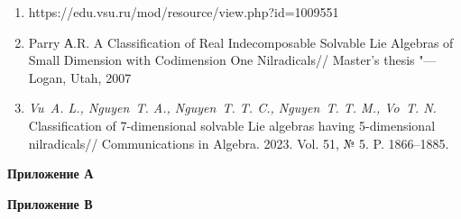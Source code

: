 \href{\href{}{}}{}\documentclass[14pt]{extarticle} %
\begin{document}
\begin{enumerate}
    \item https://edu.vsu.ru/mod/resource/view.php?id=1009551
    \item Parry А.R. A Classification of Real Indecomposable Solvable Lie Algebras of Small Dimension with Codimension One Nilradicals// Master’s thesis "--- Logan, Utah, 2007

    \item {\it Vu~A. L., Nguyen~T. A., Nguyen~T. T. C., Nguyen~T. T. M., Vo~T. N.} Classification of 7-dimensional solvable Lie algebras having 5-dimensional nilradicals// Communications in Algebra. 2023. Vol. 51, № 5. P. 1866--1885.

\end{enumerate}
\newpage
\begin{center}
    \Large \textbf{Приложение А}
\end{center}
\newpage
\begin{center}
    \Large \textbf{Приложение В}
\end{center}
\end{document}
